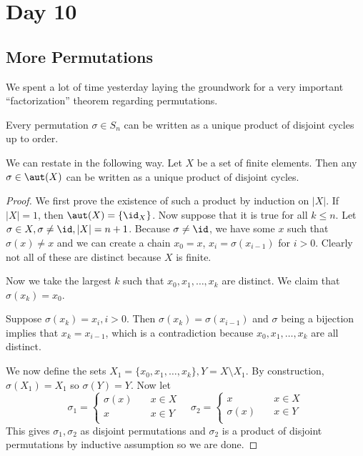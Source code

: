 \section{Day 10}

\subsection{More Permutations}
We spent a lot of time yesterday laying the groundwork for a very
important ``factorization'' theorem regarding permutations.

\begin{thm}
Every permutation $\sigma \in S_n$ can be written as a unique product of
disjoint cycles up to order.

We can restate in the following way. Let $X$ be a set of finite
elements. Then any $\sigma \in \aut(X)$ can be written as a unique
product of disjoint cycles.
\end{thm}

\begin{proof}
We first prove the existence of such a product by induction on $|X|$. If
$|X| = 1$, then $\aut(X) = \lbrace \id_X \rbrace$. Now suppose that it
is true for all $k \leq n$. Let $\sigma \in X, \sigma \neq \id, |X| = n
+ 1$.  Because $\sigma \neq \id$, we have some $x$ such that $\sigma(x)
\neq x$ and we can create a chain $x_0 = x$, $x_i = \sigma(x_{i - 1})$
for $i > 0$. Clearly not all of these are distinct because $X$ is
finite.

Now we take the largest $k$ such that $x_0, x_1, \dots, x_k$ are
distinct. We claim that $\sigma(x_k) = x_0$.

Suppose $\sigma(x_k) = x_i, i > 0$. Then $\sigma(x_k) = \sigma(x_{i -
1})$ and $\sigma$ being a bijection implies that $x_k = x_{i - 1}$,
which is a contradiction because $x_0, x_1, \dots, x_k$ are all
distinct.

We now define the sets $X_1 = \lbrace x_0, x_1, \dots, x_k \rbrace, Y =
X \setminus X_1$. By construction, $\sigma(X_1) = X_1$ so $\sigma(Y) =
Y$. Now let
\[ \sigma_1 = \left\lbrace\begin{aligned}
\sigma(x) &\quad x \in X \\
x &\quad x \in Y \\
\end{aligned}\right. \quad \sigma_2 = \left\lbrace\begin{aligned}
x &\quad x \in X \\
\sigma(x) &\quad x \in Y \\
\end{aligned}\right. \]
This gives $\sigma_1, \sigma_2$ as disjoint permutations and $\sigma_2$
is a product of disjoint permutations by inductive assumption so we are
done.
\end{proof}
